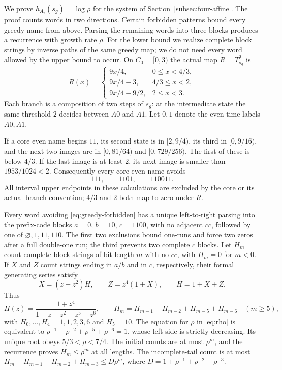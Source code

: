 \documentclass[11pt,reqno]{amsart}
\numberwithin{equation}{section}
\theoremstyle{definition}
\theoremstyle{definition}
\begin{document}
We prove $h_{A_2}(s_g)=\log\rho$ for the system of
Section~\ref{subsec:four-affine}. The proof counts words in two
directions. Certain forbidden patterns bound every greedy name from
above. Parsing the remaining words into three blocks produces a
recurrence with growth rate $\rho$. For the lower bound we realize
complete block strings by inverse paths of the same greedy map;
we do not need every word allowed by the upper bound to occur.
On $C_0=[0,3)$ the actual map $R=T_{s_g}^2$ is
\begin{equation}\label{eq:greedy-R}
 R(x)=\begin{cases}
 9x/4,&0\le x<4/3,\\
 9x/4-3,&4/3\le x<2,\\
 9x/4-9/2,&2\le x<3.
 \end{cases}
\end{equation}
Each branch is a composition of two steps of $s_g$: at the
intermediate state the same threshold $2$ decides between $A0$
and $A1$. Let $0,1$ denote the even-time labels $A0,A1$.

If a core even name begins $11$, its second state is in
$[2,9/4)$, its third in $[0,9/16)$, and the next two images
are in $[0,81/64)$ and $[0,729/256)$. The first of these
is below $4/3$. If the last image is at least $2$, its next
image is smaller than $1953/1024<2$.
Consequently every core even name avoids
\begin{equation}\label{eq:greedy-forbidden}
 111,\qquad1101,\qquad110011.
\end{equation}
All interval upper endpoints in these calculations are excluded by
the core or its actual branch convention; $4/3$ and $2$ both
map to zero under $R$.

Every word avoiding \eqref{eq:greedy-forbidden} has a unique
left-to-right parsing into the prefix-code blocks
$a=0$, $b=10$, $c=1100$, with no adjacent $cc$, followed by
one of $\varnothing,1,11,110$. The first two exclusions bound
one-runs and force two zeros after a full double-one run; the third
prevents two complete $c$ blocks. Let $H_m$ count complete block
strings of bit length $m$ with no $cc$, with $H_m=0$ for
$m<0$. If $X$ and $Z$ count strings ending in $a/b$ and in
$c$, respectively, their formal generating series satisfy
\[
 X=(z+z^2)H,\qquad Z=z^4(1+X),\qquad H=1+X+Z.
\]
Thus
\begin{equation}\label{eq:greedy-H}
 H(z)=\frac{1+z^4}{1-z-z^2-z^5-z^6},\qquad
 H_m=H_{m-1}+H_{m-2}+H_{m-5}+H_{m-6}\quad(m\ge5),
\end{equation}
with $H_0,\ldots,H_4=1,1,2,3,6$ and $H_5=10$.
The equation for $\rho$ in \eqref{eq:rho} is equivalent to
$\rho^{-1}+\rho^{-2}+\rho^{-5}+\rho^{-6}=1$, whose left side
is strictly decreasing. Its unique root obeys $5/3<\rho<7/4$.
The initial counts are at most $\rho^m$, and the recurrence
proves $H_m\le\rho^m$ at all lengths. The incomplete-tail
count is at most
$H_m+H_{m-1}+H_{m-2}+H_{m-3}\le D\rho^m$, where
$D=1+\rho^{-1}+\rho^{-2}+\rho^{-3}$.
\end{document}
